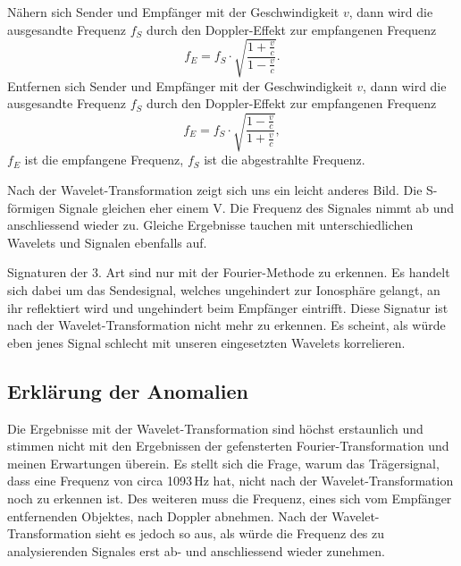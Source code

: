 \begin{refsection}
Nähern sich Sender und Empfänger mit der Geschwindigkeit $v$, dann wird die ausgesandte Frequenz $f_S$ durch den Doppler-Effekt zur empfangenen Frequenz
\[
f_E
=
f_S\cdot\sqrt{\frac{1+\frac{v}{c}}{1-\frac{v}{c}}}.
\]
Entfernen sich Sender und Empfänger mit der Geschwindigkeit $v$, dann wird die ausgesandte Frequenz $f_S$ durch den Doppler-Effekt zur empfangenen Frequenz
\[
f_E
=
f_S\cdot\sqrt{\frac{1-\frac{v}{c}}{1+\frac{v}{c}}},
\]
\(f_E\) ist die empfangene Frequenz,
\(f_S\) ist die abgestrahlte Frequenz.

Nach der Wavelet-Transformation zeigt sich uns ein leicht anderes Bild.
Die S-förmigen Signale gleichen eher einem V.
Die Frequenz des Signales nimmt ab und anschliessend wieder zu.
Gleiche Ergebnisse tauchen mit unterschiedlichen Wavelets und Signalen ebenfalls auf.

Signaturen der 3. Art sind nur mit der Fourier-Methode zu erkennen.
Es handelt sich dabei um das Sendesignal, welches ungehindert zur Ionosphäre gelangt, an ihr reflektiert wird und ungehindert beim Empfänger eintrifft.
Diese Signatur ist nach der Wavelet-Transformation nicht mehr zu erkennen.
Es scheint, als würde eben jenes Signal schlecht mit unseren eingesetzten Wavelets korrelieren. 

\subsection{Erklärung der Anomalien}
Die Ergebnisse mit der Wavelet-Transformation sind höchst erstaunlich und stimmen nicht mit den Ergebnissen der gefensterten Fourier-Transformation und meinen Erwartungen überein.
Es stellt sich die Frage, warum das Trägersignal, dass eine Frequenz von circa 1093\,Hz hat, nicht nach der Wavelet-Transformation noch zu erkennen ist.
Des weiteren muss die Frequenz, eines sich vom Empfänger entfernenden Objektes, nach Doppler abnehmen.
Nach der Wavelet-Transformation sieht es jedoch so aus, als würde die Frequenz des zu analysierenden Signales erst ab- und anschliessend wieder zunehmen.


\end{refsection}
